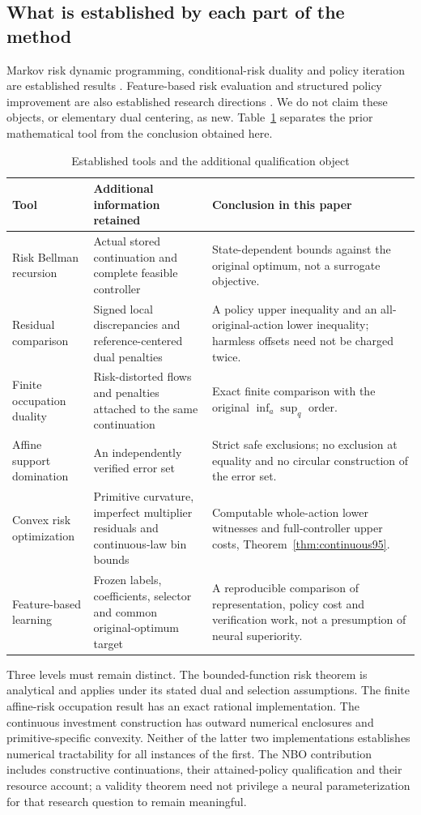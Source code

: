 \subsection{What is established by each part of the method}\label{sec:comparison95}
Markov risk dynamic programming, conditional-risk duality and policy iteration are established results \citep{ruszczynski2010risk,ruszczynski2014erratum}. Feature-based risk evaluation and structured policy improvement are also established research directions \citep{ruszczynskiyang2025}. We do not claim these objects, or elementary dual centering, as new. Table~\ref{tab:comparison95} separates the prior mathematical tool from the conclusion obtained here.
\begin{table}[htbp]
\caption{Established tools and the additional qualification object}\label{tab:comparison95}
\centering\small
\begin{tabular}{@{}p{.24\linewidth}p{.32\linewidth}p{.37\linewidth}@{}}
\toprule
Tool & Additional information retained & Conclusion in this paper\\\midrule
Risk Bellman recursion & Actual stored continuation and complete feasible controller & State-dependent bounds against the original optimum, not a surrogate objective.\\
Residual comparison & Signed local discrepancies and reference-centered dual penalties & A policy upper inequality and an all-original-action lower inequality; harmless offsets need not be charged twice.\\
Finite occupation duality & Risk-distorted flows and penalties attached to the same continuation & Exact finite comparison with the original $\inf_a\sup_q$ order.\\
Affine support domination & An independently verified error set & Strict safe exclusions; no exclusion at equality and no circular construction of the error set.\\
Convex risk optimization & Primitive curvature, imperfect multiplier residuals and continuous-law bin bounds & Computable whole-action lower witnesses and full-controller upper costs, Theorem~\ref{thm:continuous95}.\\
Feature-based learning & Frozen labels, coefficients, selector and common original-optimum target & A reproducible comparison of representation, policy cost and verification work, not a presumption of neural superiority.\\\bottomrule
\end{tabular}
\end{table}

Three levels must remain distinct. The bounded-function risk theorem is analytical and applies under its stated dual and selection assumptions. The finite affine-risk occupation result has an exact rational implementation. The continuous investment construction has outward numerical enclosures and primitive-specific convexity. Neither of the latter two implementations establishes numerical tractability for all instances of the first. The NBO contribution includes constructive continuations, their attained-policy qualification and their resource account; a validity theorem need not privilege a neural parameterization for that research question to remain meaningful.
